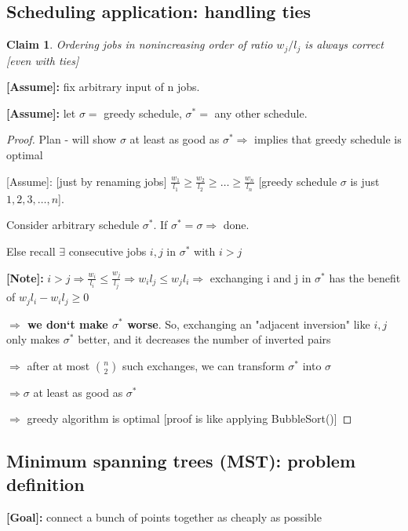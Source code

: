 \documentclass[a4paper,12pt]{article}
\theoremstyle{plain}
\newtheorem{claim}{Claim}
\theoremstyle{definition}
\theoremstyle{remark}
\begin{document}
\subsection{Scheduling application: handling ties}

\begin{claim}Ordering jobs in nonincreasing order of ratio $w_j/l_j$ is always correct [even with ties]\end{claim}

\textbf{[Assume]:} fix arbitrary input of n jobs.

\textbf{[Assume]:} let $\sigma =$ greedy schedule, $\sigma^* =$ any other schedule.

\begin{proof}

Plan - will show $\sigma$ at least as good as $\sigma^* \Rightarrow$ implies that greedy schedule is optimal

[Assume]: [just by renaming jobs] $\frac{w_1}{l_1} \geq \frac{w_2}{l_2} \geq \dots \geq \frac{w_n}{l_n}$ [greedy schedule $\sigma$ is just $1,2,3,\dots,n$].

Consider arbitrary schedule $\sigma^*$. If $\sigma^* = \sigma \Rightarrow$ done.

Else recall $\exists$ consecutive jobs $i, j$ in $\sigma^*$ with $i > j$ 

\textbf{[Note]:} $i > j \Rightarrow \frac{w_i}{l_i} \leq \frac{w_j}{l_j} \Rightarrow w_il_j \leq w_jl_i \Rightarrow$ exchanging i and j in $\sigma^*$ has the benefit of $w_jl_i - w_il_j \geq 0$

\textbf{$\Rightarrow$ we don`t make $\sigma^*$ worse}. So, exchanging an "adjacent inversion" like $i, j$ only makes $\sigma^*$ better, and it decreases the number of inverted pairs

$\Rightarrow$ after at most $n \choose 2$ such exchanges, we can transform $\sigma^*$ into $\sigma$

$\Rightarrow \sigma$ at least as good as $\sigma^*$ 

$\Rightarrow$ greedy algorithm is optimal [proof is like applying BubbleSort()]
\end{proof}



\subsection{Minimum spanning trees (MST): problem definition}

\textbf{[Goal]:} connect a bunch of points together as cheaply as possible
\\
\end{document}
